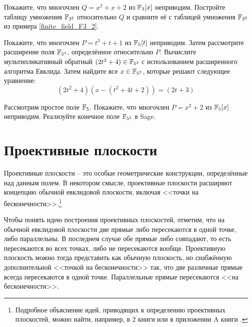 \begin{exercise} Покажите, что многочлен $Q=x^2+x+2$ из $\mathbb{F}_3[x]$ неприводим. Постройте таблицу умножения $\mathbb{F}_{3^2}$ относительно $Q$ и сравните её с таблицей умножения $\mathbb{F}_{3^2}$ из примера \ref{finite_field_F3_2}.
\end{exercise}

\begin{exercise} Покажите, что многочлен $P=t^3+t+1$ из $\mathbb{F}_5[t]$ неприводим. Затем рассмотрите расширение поля $\mathbb{F}_{5^3}$, определённое относительно $P$. Вычислите мультипликативный обратный $(2t^2+4)\in\mathbb{F}_{5^3}$ с использованием расширенного алгоритма Евклида. Затем найдите все $x\in\mathbb{F}_{5^3}$, которые решают следующее уравнение:
\begin{equation}
(2t^2+4)(x-(t^2+4t+2))= (2t+3)
\end{equation}
\end{exercise}

\begin{exercise}
\label{exercise:finite_fieldF5_2} Рассмотрим простое поле $\mathbb{F}_5$. Покажите, что многочлен $P=x^2+2$ из $\mathbb{F}_5[x]$ неприводим. Реализуйте конечное поле $\mathbb{F}_{5^2}$ в Sage.
\end{exercise}

\section{Проективные плоскости}\label{sec:planes}
Проективные плоскости -- это особые геометрические конструкции, определённые над данным полем. В некотором смысле, проективные плоскости расширяют концепцию обычной евклидовой плоскости, включая <<точки на бесконечности>>.\footnote{Подробное объяснение идей, приводящих к определению проективных плоскостей, можно найти, например, в \chaptname{} 2 книги \cite{ellis-1992} или в приложении A книги \cite{silverman-1994}.}

Чтобы понять идею построения проективных плоскостей, отметим, что на обычной евклидовой плоскости две прямые либо пересекаются в одной точке, либо параллельны. В последнем случае обе прямые либо совпадают, то есть пересекаются во всех точках, либо не пересекаются вообще. Проективную плоскость можно тогда представить как обычную плоскость, но снабжённую дополнительной <<точкой на бесконечности>> так, что две различные прямые всегда пересекаются в одной точке. Параллельные прямые пересекаются <<на бесконечности>>.

